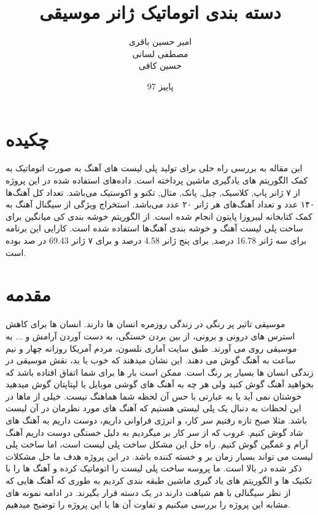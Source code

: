 \documentclass[conference]{IEEEtran}
\title{دسته بندی اتوماتیک ژانر موسیقی   }
\author{
    امیر حسین باقری\\
    مصطفی لسانی\\
    حسین کافی
    }
\date{پاییز 97}
\begin{document}
    \maketitle
    
    
    
        \section{چکیده} 
این مقاله به بررسی راه حلی برای تولید پلی لیست های آهنگ به صورت اتوماتیک به کمک الگوریتم های یاد‌گیری ماشین پرداخته است. داده‌های استفاده شده در این پروژه از ۷ ژانر پاپ, کلاسیک, چیل, پانک, متال, تکنو و اکوستیک می‌باشد. تعداد کل آهنگ‌ها ۱۴۰ عدد و تعداد آهنگ‌های هر ژانر ۲۰ عدد می‌باشد. استخراج ویژگی از سیگنال آهنگ به کمک کتابخانه لیبروزا پایتون انجام شده است. از الگوریتم خوشه بندی کی میانگین برای ساخت پلی لیست آهنگ و خوشه بندی آهنگ‌ها استفاده شده است. کارایی این برنامه برای سه ژانر 16.78 درصد, برای پنج ژانر 4.58  درصد و برای ۷ ژانر 69.43  در صد بوده است.

    
    \section{مقدمه} 
    موسیقی تاثیر پر رنگی در زندگی روزمره انسان ها دارند. انسان ها برای کاهش استرس های درونی و برونی، از بین بردن خستگی، به دست آوردن آرامش و ... به موسیقی روی می آورند. طبق سایت آماری نلسون، مردم آمریکا روزانه چهار و نیم ساعت به آهنگ گوش می دهند. این نشان میدهند که خوب یا بد، نقش موسیقی در زندگی انسان ها بسیار پر رنگ است. 
ممکن است بار ها برای شما اتفاق افتاده باشد که بخواهید آهنگ گوش کنید ولی هر چه به آهنگ های گوشی موبایل یا لپتاپتان گوش میدهید خوشتان نمی آید یا به عبارتی با حس آن لحظه شما هماهنگ نیست. خیلی از ماها در این لحظات به دنبال یک پلی لیستی هستیم که آهنگ های مورد نظرمان در آن لیست باشد. مثلا صبح تازه رفتیم سر کار، و انرژی فراوانی داریم، دوست داریم به آهنگ های شاد گوش کنیم. غروب که از سر کار بر میگردیم به دلیل خستگی دوست داریم آهنگ آرام و غمگین گوش کنیم. راه حل این مشکل ساخت پلی لیست است، اما ساخت پلی لیست می تواند بسیار زمان بر و خسته کننده باشد.
در این پروژه هدف ما حل مشکلات ذکر شده در بالا است. ما پروسه ساخت پلی لیست را اتوماتیک کرده و آهنگ ها را با تکنیک ها و الگوریتم های یاد گیری ماشین طبقه بندی کردیم به طوری که آهنگ هایی که از نظر سیگنالی با هم شباهت دارند در یک دسته قرار بگیرند. در ادامه نمونه های مشابه این پروژه را بررسی میکنیم و تفاوت آن ها با این پروژه را توضیح میدهیم. 
\end{document}
